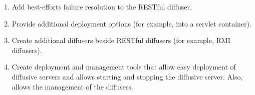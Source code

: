 \documentclass[11pt]{scrartcl}
\begin{document}
\begin{enumerate}
\item Add best-efforts failure resolution to the RESTful diffuser.
\item Provide additional deployment options (for example, into a servlet container).
\item Create additional diffusers beside RESTful diffusers (for example, RMI diffusers).
\item Create deployment and management tools that allow easy deployment of diffusive servers and allows starting and stopping the diffusive server. Also, allows the management of the diffusers.
\end{enumerate}
\end{document}
